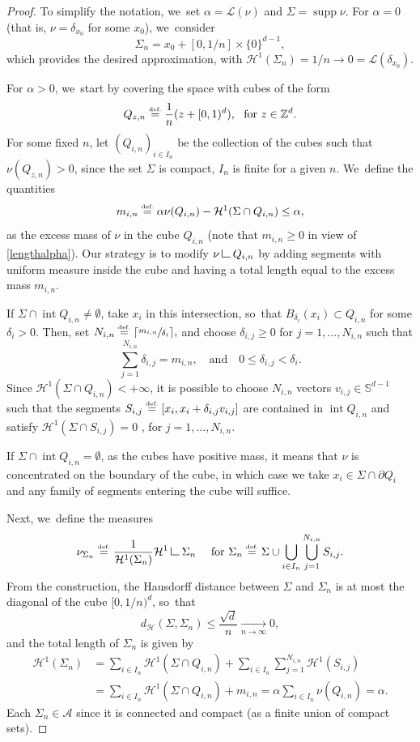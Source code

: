 \documentclass[JEP,XML,SOM,Unicode,NoFloatCountersInSection,published]{cedram}
\theoremstyle{definition}
\newcommand{\eqdef}{\ensuremath{\stackrel{\mbox{\upshape\tiny def.}}{=}}}
\newcommand\LM[1]{\hbox{\vrule width.5pt \vbox to#1pt{\vfill \hrule width#1pt height.5pt}}}
\newcommand\LL{{\mathchoice {\>\LM7\>}{\>\LM7\>}{\,\LM5\,}{\,\LM{3.35}\,}}}
\newcommand{\mres}{\LL}
\newcommand\A{\mathcal{A}}
\newcommand\cH{\mathcal{H}}
\DeclareMathOperator{\supp}{supp}
\DeclareMathOperator{\inte}{int}
\newcommand{\distH}{d_{\mathcal{H}}}
\newcommand{\ci}[2]{ \left[ #1, #2 \right] }
\begin{document}
\begin{proof}
To simplify the notation, we~set $\alpha = \mathcal{L}(\nu)$ and $\Sigma = \supp\nu$.
For $\alpha=0$ (that is, $\nu=\delta_{x_0}$ for some $x_0$), we~consider
\[
\Sigma_n = x_0 + \ci{0}{1/n}\times \{0\}^{d-1},
\]
which provides the desired approximation, with $\cH^1(\Sigma_n) = 1/n \to 0 = \mathcal{L}(\delta_{x_0})$.

For $\alpha>0$, we~start by covering the space with cubes of the form
\[
Q_{z,n} \eqdef \frac{1}{n}( z + [0,1)^d), \ \text{ for $z \in \mathbb{Z}^d$}.
\]
For some fixed $n$, let $\left(Q_{i,n}\right)_{i \in I_n}$ be the collection of the cubes such that $\nu\left(Q_{z,n}\right) > 0$, since the set $\Sigma$ is compact, $I_n$ is finite for a given $n$. We~define the quantities
\[
m_{i,n} \eqdef \alpha \nu(Q_{i,n}) - \cH^1(\Sigma \cap Q_{i,n}) \le \alpha,
\]
as the excess mass of $\nu$ in the cube $Q_{i,n}$ (note that $m_{i,n}\geq 0$ in view of \eqref{lengthalpha}). Our strategy is to modify $\nu\mres Q_{i,n}$ by adding segments with uniform measure inside the cube and having a total length equal to the excess mass $m_{i,n}$.

If $\Sigma \cap \inte Q_{i,n} \neq \emptyset$, take $x_i$ in this intersection, so~that $B_{\delta_i}(x_i) \subset Q_{i,n}$ for some $\delta_i > 0$. Then, set
$
N_{i,n} \eqdef\lceil \sfrac{m_{i,n}}{\delta_i}\rceil,
$
and choose $\delta_{i,j}\ge 0$ for $j = 1, \dots, N_{i,n}$ such that
\[
\sum_{j = 1}^{N_{i,n}} \delta_{i,j} = m_{i,n}, \quad\text{and}\quad 0 \le \delta_{i,j} < \delta_i.
\]
Since $\cH^1(\Sigma\cap Q_{i,n})<+\infty$, it is possible to choose $N_{i,n}$ vectors $v_{i,j} \in \mathbb{S}^{d-1}$ such that the segments $S_{i,j} \eqdef [x_i, x_i + \delta_{i,j}v_{i,j}]$ are contained in $\inte Q_{i,n}$ and satisfy $\cH^1(\Sigma \cap S_{i,j}) = 0$ , for $j = 1, \dots, N_{i,n}$.

If $\Sigma \cap \inte Q_{i,n} = \emptyset$, as the cubes have positive mass, it means that $\nu$ is concentrated on the boundary of the cube, in which case we take $x_i \in \Sigma \cap \partial Q_i$ and any family of segments entering the cube will suffice.

Next, we~define the measures
\[
\nu_{\Sigma_n}
\eqdef
\frac{1}{\cH^1(\Sigma_n)} \cH^1\mres \Sigma_n
\quad \text{ for }
\Sigma_n \eqdef \Sigma \cup \bigcup_{ i \in I_n}\bigcup_{j = 1}^{N_{i,n}} S_{i,j}.
\]
From the construction, the Hausdorff distance between $\Sigma$ and $\Sigma_n$ is at most the diagonal of the cube $[0,1/n)^d$, so~that
\[
\distH(\Sigma, \Sigma_n) \le \frac{\sqrt{d}}{n} \xrightarrow[n \to \infty]{} 0,
\]
and the total length of $\Sigma_n$ is given by
\begin{align*}
\cH^1(\Sigma_n)
&=
\sum_{i \in I_n} \cH^1(\Sigma \cap Q_{i,n})
+
\sum_{i \in I_n}\sum_{j = 1}^{N_{i,n}}\cH^1(S_{i,j})\\
&=
\sum_{i \in I_n}
\cH^1(\Sigma \cap Q_{i,n}) + m_{i,n}
=
\alpha
\sum_{i \in I_n}
\nu(Q_{i,n}) = \alpha.
\end{align*}
Each $\Sigma_n\in \A$ since it is connected and compact (as a finite union of compact sets).


\end{proof}
\end{document}
